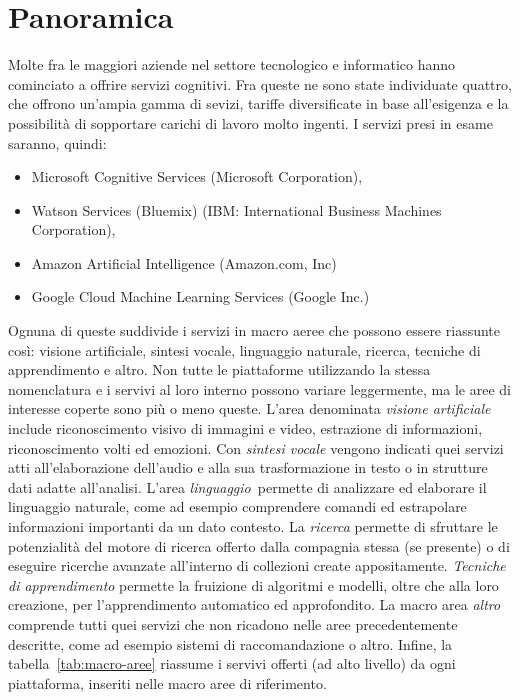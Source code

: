 
\section{Panoramica}
Molte fra le maggiori aziende nel settore tecnologico e informatico hanno cominciato a offrire servizi cognitivi.
%
Fra queste ne sono state individuate quattro, che offrono un'ampia gamma di sevizi, tariffe diversificate in base all'esigenza e la possibilità di sopportare carichi di lavoro molto ingenti.
I servizi presi in esame saranno, quindi:
\begin{itemize}
\item Microsoft Cognitive Services \cite{microsoft-link} (Microsoft Corporation),
\item Watson Services (Bluemix) \cite{ibm-link} (IBM: International Business Machines Corporation),
\item Amazon Artificial Intelligence \cite{amazon-link} (Amazon.com, Inc)
\item Google Cloud Machine Learning Services \cite{google-link} (Google Inc.)
\end{itemize}

Ognuna di queste suddivide i servizi in macro aeree che possono essere riassunte così: visione artificiale, sintesi vocale, linguaggio naturale, ricerca, tecniche di apprendimento e altro.
Non tutte le piattaforme utilizzando la stessa nomenclatura e i servivi al loro interno possono variare leggermente, ma le aree di interesse coperte sono più o meno queste.
L'area denominata \textit{visione artificiale} include riconoscimento visivo di immagini e video, estrazione di informazioni, riconoscimento volti ed emozioni.
Con \textit{sintesi vocale} vengono indicati quei servizi atti all'elaborazione dell'audio e alla sua trasformazione in testo o in strutture dati adatte all'analisi.
L'area \textit{linguaggio} permette di analizzare ed elaborare il linguaggio naturale, come ad esempio comprendere comandi ed estrapolare informazioni importanti da un dato contesto.
La \textit{ricerca} permette di sfruttare le potenzialità del motore di ricerca offerto dalla compagnia stessa (se presente) o di eseguire ricerche avanzate all'interno di collezioni create appositamente.
\textit{Tecniche di apprendimento} permette la fruizione di algoritmi e modelli, oltre che alla loro creazione, per l'apprendimento automatico ed approfondito.
La macro area \textit{altro} comprende tutti quei servizi che non ricadono nelle aree precedentemente descritte, come ad esempio sistemi di raccomandazione o altro.
Infine, la tabella~\ref{tab:macro-aree} riassume i servivi offerti (ad alto livello) da ogni piattaforma, inseriti nelle macro aree di riferimento.


